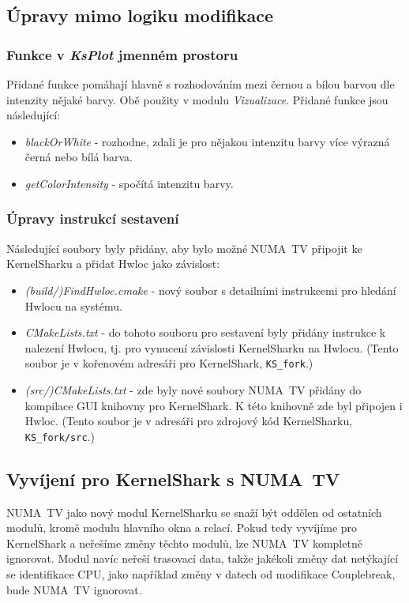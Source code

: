 \subsection{Úpravy mimo logiku modifikace}

\subsubsection*{Funkce v \emph{KsPlot} jmenném prostoru}
Přidané funkce pomáhají hlavně s rozhodováním mezi černou a bílou barvou dle intenzity nějaké barvy. Obě použity v modulu \emph{Vizualizace}. Přidané funkce jsou následující:
\begin{itemize}
    \item \emph{blackOrWhite} - rozhodne, zdali je pro nějakou intenzitu barvy více výrazná černá nebo bílá barva.
    \item \emph{getColorIntensity} - spočítá intenzitu barvy.
\end{itemize}

\subsubsection*{Úpravy instrukcí sestavení}
Následující soubory byly přidány, aby bylo možné NUMA~TV připojit ke KernelSharku a přidat Hwloc jako závislost:
\begin{itemize}
    \item \emph{(build/)FindHwloc.cmake} - nový soubor s detailními instrukcemi pro hledání Hwlocu na systému. 
    \item \emph{CMakeLists.txt} - do tohoto souboru pro sestavení byly přidány instrukce k nalezení Hwlocu, tj. pro vynucení závislosti KernelSharku na Hwlocu. (Tento soubor je v kořenovém adresáři pro KernelShark, \texttt{KS\_fork}.)
    \item \emph{(src/)CMakeLists.txt} - zde byly nové soubory NUMA~TV přidány do kompilace GUI knihovny pro KernelShark. K této knihovně zde byl připojen i Hwloc. (Tento soubor je v adresáři pro zdrojový kód KernelSharku, \texttt{KS\_fork/src}.)
\end{itemize}

\subsection{Vyvíjení pro KernelShark s NUMA~TV}
NUMA~TV jako nový modul KernelSharku se snaží být oddělen od ostatních modulů, kromě modulu hlavního okna a relací. Pokud tedy vyvíjíme pro KernelShark a neřešíme změny těchto modulů, lze NUMA~TV kompletně ignorovat. Modul navíc neřeší trasovací data, takže jakékoli změny dat netýkající se identifikace CPU, jako například změny v datech od modifikace Couplebreak, bude NUMA~TV ignorovat.

